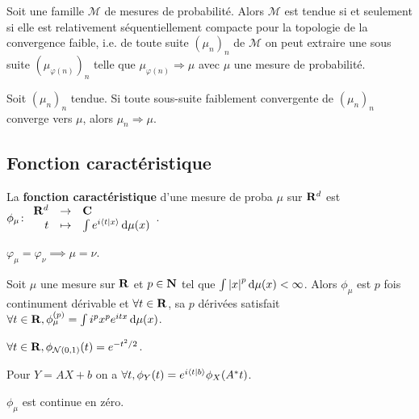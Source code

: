 	\begin{thm}[de Prokhorov]
		Soit une famille $\mathcal{M}$ de mesures de probabilité.
		Alors $\mathcal{M}$ est tendue si et seulement si elle est relativement séquentiellement compacte pour la topologie de la convergence faible, i.e. de toute suite $(\mu_n)_n$ de $\mathcal{M}$ on peut extraire une sous suite $(\mu_{\varphi(n)})_n$ telle que $\mu_{\varphi(n)} \Rightarrow \mu$ avec $\mu$ une mesure de probabilité.
	\end{thm}

	\begin{pop}
		Soit $(\mu_n)_n$ tendue.
		Si toute sous-suite faiblement convergente de $(\mu_n)_n$ converge vers $\mu$, alors $\mu_n \Rightarrow \mu$.
	\end{pop}


\subsection{Fonction caractéristique}

	\begin{defn}
		La \textbf{fonction caractéristique} d'une mesure de proba $\mu$ sur $\mathbf{R}^d$ est
		$\phi_\mu \colon \begin{array}{rcl}
		\mathbf{R}^d & \to & \mathbf{C} \\
		t & \mapsto & \int e^{i \left\langle t \mid x \right\rangle} \mathop{}\mathopen{}\mathrm{d} \mu(x)
		\end{array}$.
	\end{defn}
	
	\begin{thm}
		$\varphi_\mu = \varphi_\nu \implies \mu = \nu$.
	\end{thm}
	
	\begin{pop}
		Soit $\mu$ une mesure sur $\mathbf{R}$ et $p \in \mathbf{N}$ tel que $\int \left\lvert x\right\rvert^p \mathop{}\mathopen{}\mathrm{d} \mu(x) < \infty$.
		Alors $\phi_\mu$ est $p$ fois continument dérivable et $\forall t \in \mathbf{R}$, sa $p$ dérivées satisfait $\forall t \in \mathbf{R}, \phi_\mu^{(p)} = \int i^p x^p e^{itx} \mathop{}\mathopen{}\mathrm{d} \mu(x)$.
	\end{pop}

	\begin{ex}
		$\forall t \in \mathbf{R}, \phi_{\mathcal{N}(0,1)}(t) = e^{-t^2/2}$.
	\end{ex}

	\begin{pop}
		Pour $Y = AX + b$ on a $\forall t, \phi_Y(t) = e^{i \left\langle t \mid b \right\rangle} \phi_X(A^* t)$.
	\end{pop}

	\begin{pop}
		$\phi_\mu$ est continue en zéro.
	\end{pop}

